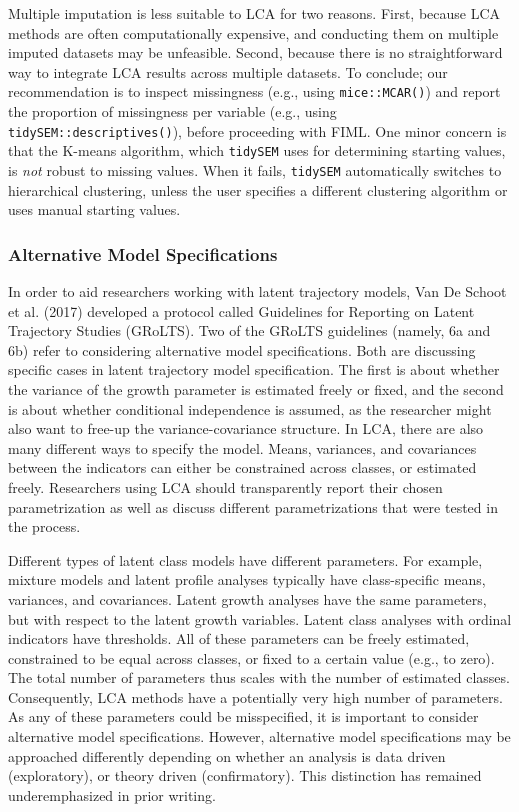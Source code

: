 \documentclass[
  ,man,floatsintext]{apa6}
\begin{document}
Multiple imputation is less suitable to LCA for two reasons.
First, because LCA methods are often computationally expensive,
and conducting them on multiple imputed datasets may be unfeasible.
Second, because there is no straightforward way
to integrate LCA results across multiple datasets.
To conclude; our recommendation is to inspect missingness
(e.g., using \texttt{mice::MCAR()})
and report the proportion of missingness per variable
(e.g., using \texttt{tidySEM::descriptives()}),
before proceeding with FIML.
One minor concern is that the K-means algorithm,
which \texttt{tidySEM} uses for determining starting values,
is \emph{not} robust to missing values.
When it fails, \texttt{tidySEM} automatically switches to hierarchical clustering,
unless the user specifies a different
clustering algorithm or uses manual starting values.

\hypertarget{alternative-model-specifications}{%
\subsubsection{Alternative Model Specifications}\label{alternative-model-specifications}}

In order to aid researchers working with latent trajectory models,
Van De Schoot et al. (2017) developed a protocol called
Guidelines for Reporting on Latent Trajectory Studies (GRoLTS).
Two of the GRoLTS guidelines (namely, 6a and 6b) refer to
considering alternative model specifications.
Both are discussing specific cases in latent trajectory model specification.
The first is about whether the variance of the growth parameter
is estimated freely or fixed,
and the second is about whether conditional independence is assumed,
as the researcher might also want to free-up the variance-covariance structure.
In LCA, there are also many different ways to specify the model.
Means, variances, and covariances between the indicators
can either be constrained across classes, or estimated freely.
Researchers using LCA should transparently report their chosen parametrization
as well as discuss different parametrizations that were tested in the process.

Different types of latent class models have different parameters.
For example, mixture models and latent profile analyses
typically have class-specific means, variances, and covariances.
Latent growth analyses have the same parameters,
but with respect to the latent growth variables.
Latent class analyses with ordinal indicators have thresholds.
All of these parameters can be freely estimated,
constrained to be equal across classes,
or fixed to a certain value (e.g., to zero).
The total number of parameters thus
scales with the number of estimated classes.
Consequently, LCA methods have a potentially very high number of parameters.
As any of these parameters could be misspecified,
it is important to consider alternative model specifications.
However, alternative model specifications may be approached differently
depending on whether an analysis is data driven (exploratory),
or theory driven (confirmatory).
This distinction has remained underemphasized in prior writing.
\end{document}
